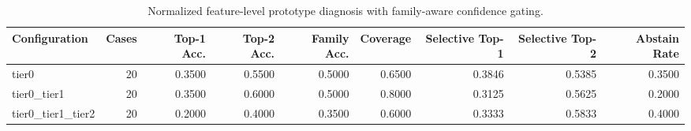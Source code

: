 \begin{table}[t]
\centering
\caption{Normalized feature-level prototype diagnosis with family-aware confidence gating.}
\label{tab:dice_stressor_hierarchical_diagnosis}
\footnotesize
\begin{tabular}{lrrrrrrrr}
\toprule
Configuration & Cases & Top-1 Acc. & Top-2 Acc. & Family Acc. & Coverage & Selective Top-1 & Selective Top-2 & Abstain Rate \\
\midrule
tier0 & 20 & 0.3500 & 0.5500 & 0.5000 & 0.6500 & 0.3846 & 0.5385 & 0.3500 \\
tier0_tier1 & 20 & 0.3500 & 0.6000 & 0.5000 & 0.8000 & 0.3125 & 0.5625 & 0.2000 \\
tier0_tier1_tier2 & 20 & 0.2000 & 0.4000 & 0.3500 & 0.6000 & 0.3333 & 0.5833 & 0.4000 \\
\bottomrule
\end{tabular}

\end{table}
